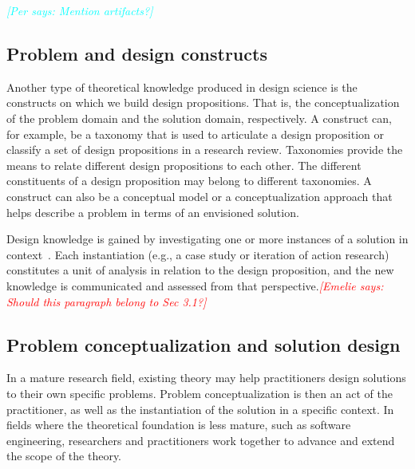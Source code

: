 \documentclass[graybox]{svmult}
\newcommand{\emelie}[1]{\textcolor{red}{{\it [Emelie says: #1]}}}
\newcommand{\peggy}[1]{\textcolor{blue}{{\it [Peggy says: #1]}}}
\newcommand{\per}[1]{\textcolor{cyan}{{\it [Per says: #1]}}}
\newcommand{\emelie}[1]{}
\newcommand{\peggy}[1]{}
\newcommand{\per}[1]{}
\begin{document}
\per{Mention artifacts?}



\subsection{Problem and design constructs}
\label{sec:constructs}
Another type of theoretical knowledge produced in design science is the 
constructs on which we build design propositions. That is, the conceptualization of the problem domain and the solution domain, respectively.  
A construct can, for example, be a taxonomy that is used to articulate a design proposition or classify a set of design propositions in a research review. 
Taxonomies provide the means to relate different design propositions to each other. The different constituents of a design proposition may belong to different taxonomies. A construct can also be a conceptual model or a conceptualization approach that helps describe a problem in terms of an envisioned solution.

Design knowledge is gained by investigating one or more instances of a solution in context~\cite{wieringa_what_2014}. Each instantiation (e.g., a case study or iteration of action research) constitutes a unit of analysis in relation to the design proposition, and the new knowledge is communicated and assessed from that perspective.\emelie{Should this paragraph belong to Sec 3.1?} 

\subsection{Problem conceptualization and solution design}


In a mature research field, existing theory may help practitioners design solutions to their own specific problems. Problem conceptualization is then an act of the practitioner, as well as the instantiation of the solution in a specific context. In fields where the theoretical foundation is less mature, such as software engineering, researchers and practitioners work together to advance and extend the scope of the theory. 
\end{document}
